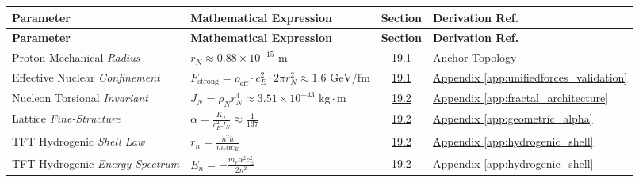 \vspace{0.5cm}
\noindent
\renewcommand{\arraystretch}{1.6}
\begin{longtable}{@{} p{4.5cm} p{6cm} c p{4cm} @{}}
\toprule
\textbf{Parameter} & \textbf{Mathematical Expression} & \textbf{Section} & \textbf{Derivation Ref.} \\
\midrule
\endfirsthead

\toprule
\textbf{Parameter} & \textbf{Mathematical Expression} & \textbf{Section} & \textbf{Derivation Ref.} \\
\midrule
\endhead

Proton Mechanical \newline \textit{Radius} & $r_N \approx 0.88 \times 10^{-15} \text{ m}$ & \hyperref[sec:19.1]{19.1} & Anchor Topology \\

Effective Nuclear \newline \textit{Confinement} & $F_{\text{strong}} = \rho_{\text{eff}} \cdot c_E^2 \cdot 2\pi r_N^2 \approx 1.6 \text{ GeV/fm}$ & \hyperref[sec:19.1]{19.1} & \hyperref[app:unifiedforces_validation]{Appendix \ref*{app:unifiedforces_validation}} \\

Nucleon Torsional \newline \textit{Invariant} & $J_N = \rho_N r_N^4 \approx 3.51 \times 10^{-43} \text{ kg}\cdot\text{m}$ & \hyperref[sec:19.2]{19.2} & \hyperref[app:fractal_architecture]{Appendix \ref*{app:fractal_architecture}} \\

Lattice \newline \textit{Fine-Structure} & $\alpha = \frac{K_L}{c_E^2 J_N} \approx \frac{1}{137}$ & \hyperref[sec:19.2]{19.2} & \hyperref[app:geometric_alpha]{Appendix \ref*{app:geometric_alpha}} \\

TFT Hydrogenic \newline \textit{Shell Law} & $r_n = \frac{n^2 \hbar}{m_e \alpha c_E}$ & \hyperref[sec:19.2]{19.2} & \hyperref[app:hydrogenic_shell]{Appendix \ref*{app:hydrogenic_shell}} \\

TFT Hydrogenic \newline \textit{Energy Spectrum} & $E_n = -\frac{m_e \alpha^2 c_E^2}{2n^2}$ & \hyperref[sec:19.2]{19.2} & \hyperref[app:hydrogenic_shell]{Appendix \ref*{app:hydrogenic_shell}} \\


\end{longtable}
